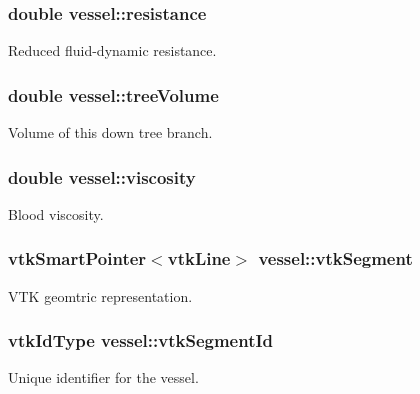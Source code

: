 \subsubsection[{\texorpdfstring{resistance}{resistance}}]{\setlength{\rightskip}{0pt plus 5cm}double vessel\+::resistance}\hypertarget{structvessel_a86ef98b7df955a65573227a3cde46caf}{}\label{structvessel_a86ef98b7df955a65573227a3cde46caf}
Reduced fluid-\/dynamic resistance. 
\subsubsection[{\texorpdfstring{tree\+Volume}{treeVolume}}]{\setlength{\rightskip}{0pt plus 5cm}double vessel\+::tree\+Volume}\hypertarget{structvessel_af3b90f07ee76daa83102037ce22a1b9e}{}\label{structvessel_af3b90f07ee76daa83102037ce22a1b9e}
Volume of this down tree branch. 
\subsubsection[{\texorpdfstring{viscosity}{viscosity}}]{\setlength{\rightskip}{0pt plus 5cm}double vessel\+::viscosity}\hypertarget{structvessel_af3e4426db331f595682f9f1b3e4226c4}{}\label{structvessel_af3e4426db331f595682f9f1b3e4226c4}
Blood viscosity. 
\subsubsection[{\texorpdfstring{vtk\+Segment}{vtkSegment}}]{\setlength{\rightskip}{0pt plus 5cm}vtk\+Smart\+Pointer$<$vtk\+Line$>$ vessel\+::vtk\+Segment}\hypertarget{structvessel_a94ada1fa10871eef938547df1267d66e}{}\label{structvessel_a94ada1fa10871eef938547df1267d66e}
V\+TK geomtric representation. 
\subsubsection[{\texorpdfstring{vtk\+Segment\+Id}{vtkSegmentId}}]{\setlength{\rightskip}{0pt plus 5cm}vtk\+Id\+Type vessel\+::vtk\+Segment\+Id}\hypertarget{structvessel_a5a44bb20222578bb67bf051164db7aad}{}\label{structvessel_a5a44bb20222578bb67bf051164db7aad}
Unique identifier for the vessel. 
